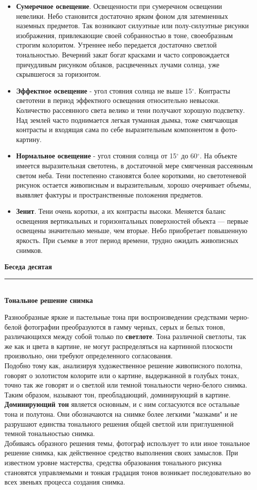 \documentclass{article}
\newcommand{\important}[1]{\textbf{#1}}
\renewcommand{\section}[2]{
	\vspace{6em}
	\begin{flushright}
		\Large
		\baselineskip=0.5\baselineskip
		\textbf{#1}
		\\
		\rule[0.5\baselineskip]{\textwidth}{0.15pt}
		\\
		\textbf{#2}
	\end{flushright}
}
\begin{document}
\begin{itemize}
	\item \important{Сумеречное освещение}. Освещенности при сумеречном освещении невелики. Небо становится достаточно ярким фоном для затемненных наземных предметов. Так возникают силуэтные или полу-силуэтные рисунки изображения, привлекающие своей собранностью в тоне, своеобразным строгим колоритом. Утреннее небо передается достаточно светлой тональностью. Вечерний закат богат красками и часто сопровождается причудливым рисунком облаков, расцвеченных лучами солнца, уже скрывшегося за горизонтом.
	\item \important{Эффектное освещение} - угол стояния солнца не выше 15$^{\circ}$. Контрасты светотени в период эффектного освещения относительно невысоки. Количество рассеянного света велико и тени получают хорошую подсветку. Над землей часто поднимается легкая туманная дымка, тоже смягчающая контрасты и входящая сама по себе выразительным компонентом в фото-картину.
	\item \important{Нормальное освещение} - угол стояния солнца от 15$^{\circ}$ до 60$^{\circ}$. На объекте имеется выразительная светотень, в достаточной мере смягченная рассеянным светом неба. Тени постепенно становятся более короткими, но светотеневой рисунок остается живописным и выразительным, хорошо очерчивает объемы, выявляет фактуры и пространственные положения предметов.
	\item \important{Зенит}. Тени очень коротки, а их контрасты высоки. Меняется баланс освещения вертикальных и горизонтальных поверхностей объекта --- первые освещены значительно меньше, чем вторые. Небо приобретает повышенную яркость. При съемке в этот период времени, трудно ожидать живописных снимков.
\end{itemize}
\section{Беседа десятая}{Тональное решение снимка}
Разнообразные яркие и пастельные тона при воспроизведении средствами черно-белой фотографии преобразуются в гамму черных, серых и белых тонов, различающихся между собой только по \important{светлоте}. Тона различной светлоты, так же как и цвета в картине, не могут распределяться на картинной плоскости произвольно, они требуют определенного согласования.\\
Подобно тому как, анализируя художественное решение живописного полотна, говорят о золотистом колорите или о картине, выдержанной в голубых тонах, точно так же говорят и о светлой или темной тональности черно-белого снимка. Таким образом, называют тон, преобладающий, доминирующий в картине. \important{Доминирующий тон} является основным, и с ним согласуются все остальные тона и полутона. Они обозначаются на снимке более легкими "мазками" и не разрушают единства тонального решения общей светлой или приглушенной темной тональностью снимка.\\
Добиваясь образного решения темы, фотограф использует то или иное тональное решение снимка, как действенное средство выполнения своих замыслов. При известном уровне мастерства, средства образования тонального рисунка становятся управляемыми и тонкая градация тонов возникает последовательно во всех звеньях процесса создания снимка.
\end{document}
